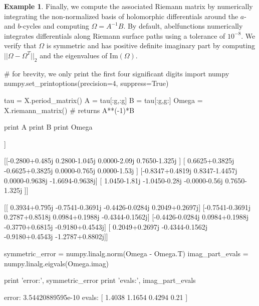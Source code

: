 \documentclass[12pt]{article}
\theoremstyle{definition}
\newtheorem{example}[theorem]{Example}
\begin{document}
\begin{example}
Finally, we compute the associated Riemann matrix by numerically
integrating the non-normalized basis of holomorphic differentials around
the $a$- and $b$-cycles and computing $\Omega = A^{-1}B$. By default,
{\sc abelfunctions} numerically integrates differentials along Riemann
surface paths using a tolerance of $10^{-8}$. We verify that $\Omega$ is
symmetric and has positive definite imaginary part by computing
$||\Omega-\Omega^T||_2$ and the eigenvalues of $\text{Im}(\Omega)$.
\begin{ipythoninput}
# for brevity, we only print the first four significant digits
import numpy
numpy.set_printoptions(precision=4, suppress=True)

tau = X.period_matrix()
A = tau[:g,:g]
B = tau[:g,g:]
Omega = X.riemann_matrix()  # returns A**(-1)*B

print A
print B
print Omega
\end{ipythoninput}
\begin{ipythonoutput}
[[ 0.2800+1.045j   0.2800-0.485j  -1.8100+1.045j   0.0000-0.j    ]
 [ 0.6625-1.1475j  0.6625+0.3825j -0.6625-1.1475j -0.0000+1.53j  ]
 [-0.8347+0.4819j -0.8347+0.4819j  0.8347-1.4457j  0.0000+1.9276j]
 [-1.0450+0.28j   -1.0450+1.81j   -0.4850+0.28j    0.0000+0.j    ]]

[[-0.2800+0.485j   0.2800-1.045j   0.0000-2.09j    0.7650-1.325j ]
 [ 0.6625+0.3825j -0.6625+0.3825j  0.0000-0.765j   0.0000-1.53j  ]
 [-0.8347+0.4819j  0.8347-1.4457j  0.0000-0.9638j -1.6694-0.9638j]
 [ 1.0450-1.81j   -1.0450-0.28j   -0.0000-0.56j    0.7650-1.325j ]]

[[ 0.3934+0.795j  -0.7541-0.3691j -0.4426-0.0284j  0.2049+0.2697j]
 [-0.7541-0.3691j  0.2787+0.8518j  0.0984+0.1988j -0.4344-0.1562j]
 [-0.4426-0.0284j  0.0984+0.1988j -0.3770+0.6815j -0.9180+0.4543j]
 [ 0.2049+0.2697j -0.4344-0.1562j -0.9180+0.4543j -1.2787+0.8802j]]
\end{ipythonoutput}
\begin{ipythoninput}
symmetric_error = numpy.linalg.norm(Omega - Omega.T)
imag_part_evals = numpy.linalg.eigvals(Omega.imag)

print 'error:', symmetric_error
print 'evals:', imag_part_evals
\end{ipythoninput}
\begin{ipythonoutput}
error: 3.54420889595e-10
evals: [ 1.4038  1.1654  0.4294  0.21  ]
\end{ipythonoutput}
\end{example}
\end{document}
